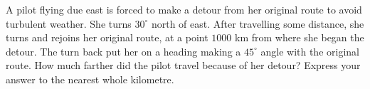 A pilot flying due east is forced to make a detour from her original route to avoid turbulent weather. She turns $30^\circ$ north of east. After travelling some distance, she turns and rejoins her original route, at a point $1000$ km from where she began the detour. The turn back put her on a heading making a $45^\circ$ angle with the original route. How much farther did the pilot travel because of her detour? Express your answer to the nearest whole kilometre.
